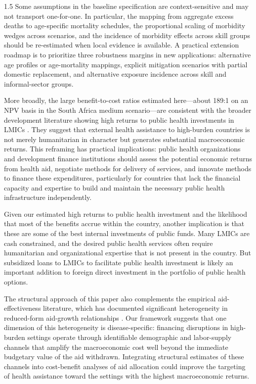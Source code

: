 \documentclass[letterpaper,12pt]{article}
\theoremstyle{definition}
\begin{document}
\begin{spacing}{1.5}
Some assumptions in the baseline specification are context-sensitive and may not transport one-for-one. In particular, the mapping from aggregate excess deaths to age-specific mortality schedules, the proportional scaling of morbidity wedges across scenarios, and the incidence of morbidity effects across skill groups should be re-estimated when local evidence is available. A practical extension roadmap is to prioritize three robustness margins in new applications: alternative age profiles or age-mortality mappings, explicit mitigation scenarios with partial domestic replacement, and alternative exposure incidence across skill and informal-sector groups.

More broadly, the large benefit-to-cost ratios estimated here---about 189:1 on an NPV basis in the South Africa medium scenario---are consistent with the broader development literature showing high returns to public health investments in LMICs \citep{coleImpactPoorHealth2006,turanLifeExpectancyEconomic2020}. They suggest that external health assistance to high-burden countries is not merely humanitarian in character but generates substantial macroeconomic returns. This reframing has practical implications: public health organizations and development finance institutions should assess the potential economic returns from health aid, negotiate methods for delivery of services, and innovate methods to finance these expenditures, particularly for countries that lack the financial capacity and expertise to build and maintain the necessary public health infrastructure independently.

Given our estimated high returns to public health investment and the likelihood that most of the benefits accrue within the country, another implication is that these are some of the best internal investments of public funds. Many LMICs are cash constrained, and the desired public health services often require humanitarian and organizational expertise that is not present in the country. But subsidized loans to LMICs to facilitate public health investment is likely an important addition to foreign direct investment in the portfolio of public health options.

The structural approach of this paper also complements the empirical aid-effectiveness literature, which has documented significant heterogeneity in reduced-form aid-growth relationships \citep{BurnsideDollar:2000}. Our framework suggests that one dimension of this heterogeneity is disease-specific: financing disruptions in high-burden settings operate through identifiable demographic and labor-supply channels that amplify the macroeconomic cost well beyond the immediate budgetary value of the aid withdrawn. Integrating structural estimates of these channels into cost-benefit analyses of aid allocation could improve the targeting of health assistance toward the settings with the highest macroeconomic returns.


\end{spacing}
\end{document}

